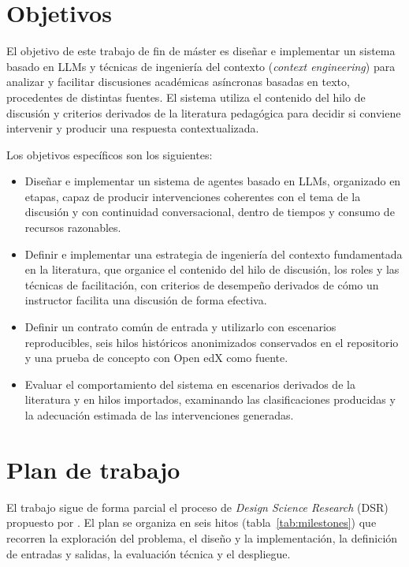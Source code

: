 \section{Objetivos}

El objetivo de este trabajo de fin de máster es diseñar e implementar un sistema basado en LLMs y técnicas de ingeniería del contexto (\textit{context engineering}) para analizar y facilitar discusiones académicas asíncronas basadas en texto, procedentes de distintas fuentes. El sistema utiliza el contenido del hilo de discusión y criterios derivados de la literatura pedagógica para decidir si conviene intervenir y producir una respuesta contextualizada.

Los objetivos específicos son los siguientes:

\begin{itemize}
  \item Diseñar e implementar un sistema de agentes basado en LLMs, organizado en etapas, capaz de producir intervenciones coherentes con el tema de la discusión y con continuidad conversacional, dentro de tiempos y consumo de recursos razonables.
  \item Definir e implementar una estrategia de ingeniería del contexto fundamentada en la literatura, que organice el contenido del hilo de discusión, los roles y las técnicas de facilitación, con criterios de desempeño derivados de cómo un instructor facilita una discusión de forma efectiva.
  \item Definir un contrato común de entrada y utilizarlo con escenarios reproducibles, seis hilos históricos anonimizados conservados en el repositorio y una prueba de concepto con Open edX como fuente.
  \item Evaluar el comportamiento del sistema en escenarios derivados de la literatura y en hilos importados, examinando las clasificaciones producidas y la adecuación estimada de las intervenciones generadas.
\end{itemize}

\section{Plan de trabajo}

El trabajo sigue de forma parcial el proceso de \textit{Design Science Research} (DSR) propuesto por \textcite{PeffersEtAl2007}. El plan se organiza en seis hitos (tabla~\ref{tab:milestones}) que recorren la exploración del problema, el diseño y la implementación, la definición de entradas y salidas, la evaluación técnica y el despliegue.

